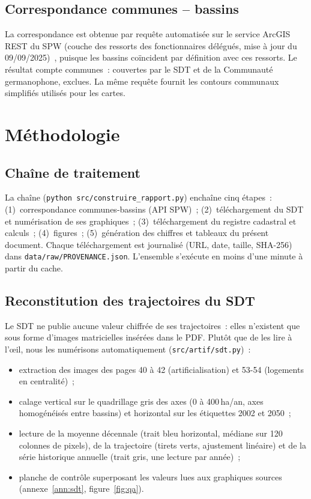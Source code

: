 \documentclass[11pt,a4paper]{report}
\newcommand{\fichier}[1]{\texttt{\small #1}}
\newcommand{\haan}{\,ha/an}
\begin{document}
\section{Correspondance communes -- bassins}
\label{sec:bassins}
La correspondance est obtenue par requête automatisée sur le service ArcGIS REST du SPW (couche des ressorts des fonctionnaires délégués, mise à jour du 09/09/2025)~\citep{spw_dirext}, puisque les bassins coïncident par définition avec ces ressorts. Le résultat compte \NbCommunes{} communes~: \NbCommunesSDT{} couvertes par le SDT et \NbCommunesCG{} de la Communauté germanophone, exclues. La même requête fournit les contours communaux simplifiés utilisés pour les cartes.

\chapter{Méthodologie}
\label{ch:methode}

\section{Chaîne de traitement}
La chaîne (\fichier{python src/construire\_rapport.py}) enchaîne cinq étapes~: (1)~correspondance communes-bassins (API SPW)~; (2)~téléchargement du SDT et numérisation de ses graphiques~; (3)~téléchargement du registre cadastral et calculs~; (4)~figures~; (5)~génération des chiffres et tableaux du présent document. Chaque téléchargement est journalisé (URL, date, taille, SHA-256) dans \fichier{data/raw/PROVENANCE.json}. L'ensemble s'exécute en moins d'une minute à partir du cache.

\section{Reconstitution des trajectoires du SDT}
\label{sec:numerisation}
Le SDT ne publie aucune valeur chiffrée de ses trajectoires~: elles n'existent que sous forme d'images matricielles insérées dans le PDF. Plutôt que de les lire à l'\oe il, nous les numérisons automatiquement (\fichier{src/artif/sdt.py})~:
\begin{itemize}
\item extraction des images des pages 40 à 42 (artificialisation) et 53-54 (logements en centralité)~;
\item calage vertical sur le quadrillage gris des axes (0 à 400\haan, axes homogénéisés entre bassins) et horizontal sur les étiquettes 2002 et 2050~;
\item lecture de la moyenne décennale (trait bleu horizontal, médiane sur 120 colonnes de pixels), de la trajectoire (tirets verts, ajustement linéaire) et de la série historique annuelle (trait gris, une lecture par année)~;
\item planche de contrôle superposant les valeurs lues aux graphiques sources (annexe~\ref{ann:sdt}, figure~\ref{fig:qa}).
\end{itemize}
\end{document}
